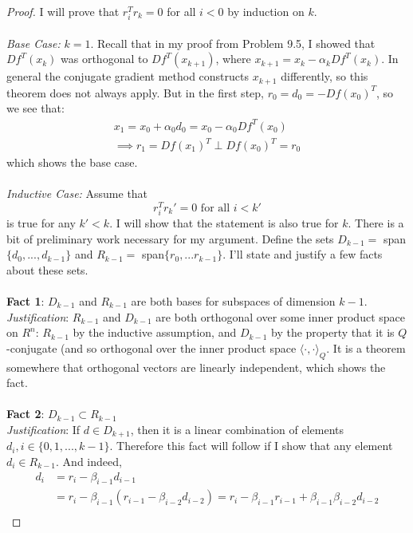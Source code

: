 \documentclass[12pt]{article}
\newenvironment{problem}[2][Problem]{\begin{trivlist}
\item[\hskip \labelsep {\bfseries #1}\hskip \labelsep {\bfseries #2.}]}{\end{trivlist}}
\theoremstyle{definition}
\theoremstyle{definition}
\theoremstyle{definition}
\theoremstyle{definition}
\begin{document}
\begin{problem}{9.20}
\begin{proof}
I will prove that $r_i^T r_k = 0$ for all $i < 0$ by induction on $k$. \\
\\
\textit{Base Case:} $k = 1$. Recall that in my proof from Problem 9.5, I showed that $Df^T(x_k)$ was orthogonal to $Df^T(x_{k+1})$, where $x_{k+1} = x_k - \alpha_k Df^T(x_k)$. In general the conjugate gradient method constructs $x_{k+1}$ differently, so this theorem does not always apply. But in the first step, $r_0 = d_0 = -Df(x_0)^T$, so we see that:
\begin{align*}
x_1 = x_0 + \alpha_0 d_0 = x_0 - \alpha_0 Df^T(x_0) \\
\implies r_1 = Df(x_1)^T \perp Df(x_0)^T = r_0 
\end{align*}
which shows the base case. \\
\\
\textit{Inductive Case:} Assume that 
$$r_i^T r_k' = 0 \text{ for all } i < k'$$ is true for any $k' < k$. I will show that the statement is also true for $k$. There is a bit of preliminary work necessary for my argument. Define the sets $D_{k-1} = $ span$\{d_0,...,d_{k-1}\}$ and $R_{k-1} = $ span$\{r_0, ... r_{k-1}\}$. I'll state and justify a few facts about these sets. \\
\\
\textbf{Fact 1}: $D_{k-1}$ and $R_{k-1}$ are both bases for subspaces of dimension $k-1$.\\
\textit{Justification}: $R_{k-1}$ and $D_{k-1}$ are both orthogonal over some inner product space on $R^{n}$: $R_{k-1}$ by the inductive assumption, and $D_{k-1}$ by the property that it is $Q$-conjugate (and so orthogonal over the inner product space $\langle \cdot, \cdot \rangle_Q$. It is a theorem somewhere that orthogonal vectors are linearly independent, which shows the fact. \\
\\
\textbf{Fact 2}: $D_{k-1} \subset R_{k-1}$ \\
\textit{Justification}: If $d \in D_{k+1}$, then it is a linear combination of elements $d_i, i \in \{0, 1, ..., k-1\}$. Therefore this fact will follow if I show that any element $d_i \in R_{k-1}$. And indeed, 
\begin{align*}
d_i &= r_{i} - \beta_{i-1}d_{i-1} \\
&= r_i - \beta_{i-1}(r_{i-1} - \beta_{i-2}d_{i-2}) = r_i - \beta_{i-1} r_{i-1} + \beta_{i-1} \beta_{i-2} d_{i-2} \\

\end{align*}
\end{proof}
\end{problem}
\end{document}
